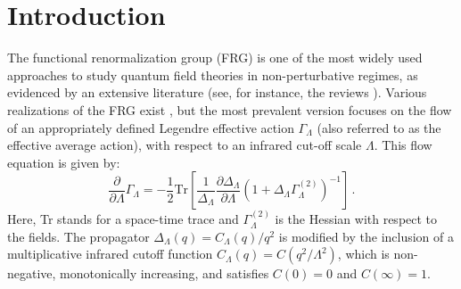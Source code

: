 \documentclass[11pt,a4paper]{article}
\numberwithin{figure}{section}
\numberwithin{equation}{section}
\begin{document}
\newpage

\tableofcontents

\newpage


\section{Introduction}



The functional renormalization group (FRG) is one of the most widely used approaches to study quantum field theories in non-perturbative regimes, as evidenced by an extensive literature (see, for instance, the reviews \cite{Morris:1998,Bagnuls:2000,Berges:2000ew,Pelissetto:2000ek,Rosten:2010vm,Dupuis:2020fhh}).
Various realizations of the FRG exist \cite{Wilson:1973,Wegner:1972ih,Polchinski:1983gv,Latorre:2000qc,Arnone:2002cs,Nicoll1977,Wetterich:1992,Morris:1993,Weinberg:1976xy,Bonini:1992vh,Ellwanger1994a,Morgan1991}, but the most prevalent version \cite{Nicoll1977,Wetterich:1992,Morris:1993,Weinberg:1976xy,Bonini:1992vh,Ellwanger1994a,Morgan1991} focuses on the flow of an appropriately defined Legendre effective action $\Gamma_\Lambda$ (also referred to as the effective average action), with respect to an infrared cut-off scale $\Lambda$. This flow equation is given by:
\begin{equation}
\label{flow}
    \frac{\partial}{\partial\Lambda} \Gamma_\Lambda=-\frac{1}{2}\text{Tr}\left[   \frac{1}{\Delta_\Lambda} \frac{\partial \Delta_\Lambda}{\partial\Lambda}\left(1+\Delta_\Lambda \Gamma^{(2)}_\Lambda\right)^{-1}  \right] \,.
\end{equation}
Here, Tr stands for a space-time trace and $\Gamma^{(2)}_\Lambda$ is the Hessian with respect to the fields. The propagator $\Delta_\Lambda(q)=C_\Lambda(q)/q^2$ is modified by the inclusion of a multiplicative infrared cutoff function $C_\Lambda(q)=C(q^2/\Lambda^2)$, which is non-negative, monotonically increasing, and satisfies $C(0)=0$ and $C(\infty)=1$.
\end{document}

